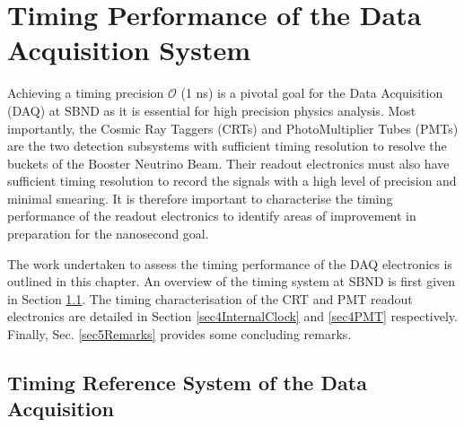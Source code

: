 \chapter{Timing Performance of the Data Acquisition System}
\label{ChapterDAQ}
\ifpdf
    \graphicspath{{Chapter7/Figs/Raster/}{Chapter7/Figs/PDF/}{Chapter7/Figs/}}
\else
    \graphicspath{{Chapter7/Figs/Vector/}{Chapter7/Figs/}}
\fi

Achieving a timing precision $\mathcal{O}$ (1 ns) is a pivotal goal for the Data Acquisition (DAQ) at SBND as it is essential for high precision physics analysis. 
Most importantly, the Cosmic Ray Taggers (CRTs) and PhotoMultiplier Tubes (PMTs) are the two detection subsystems with sufficient timing resolution to resolve the buckets of the Booster Neutrino Beam.
Their readout electronics must also have sufficient timing resolution to record the signals with a high level of precision and minimal smearing.
It is therefore important to characterise the timing performance of the readout electronics to identify areas of improvement in preparation for the nanosecond goal. 

The work undertaken to assess the timing performance of the DAQ electronics is outlined in this chapter.
An overview of the timing system at SBND is first given in Section \ref{sec4TimeRef}. 
The timing characterisation of the CRT and PMT readout electronics are detailed in Section \ref{sec4InternalClock} and \ref{sec4PMT} respectively.
Finally, Sec. \ref{sec5Remarks} provides some concluding remarks.

\newpage

\section{Timing Reference System of the Data Acquisition}
\label{sec4TimeRef}

